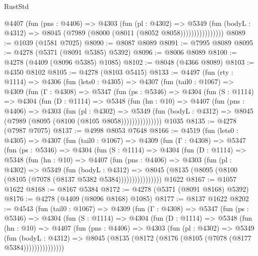 \begin{lexlean}{RustStd}
\begin{coremodule}
                    @4407
                      (fun (pns : @4406) =>
                      @4303
                        (fun (pl : @4302) =>
                        @5349
                          (fun (bodyL : @4312) =>
                          @8045 (@7989 (@8000 (@8011 (@8052 @8058))))))))))))))))
@8089 := @1039 (@1581 @7025)
@8090 := @8087 @8089
@8091 := @7995 @8089
@8095 := @4278 (@5371 (@8091 @5385) @5392)
@8096 := @8006 @8089
@8100 := @4278 (@4409 (@8096 @5385) @1085)
@8102 := @8048 (@4366 @8089)
@8103 := @4350 @8102
@8105 := @4278 (@8103 @5415)
@8133 := @4497
    (fun (rty : @1114) =>
    @4306
      (fun (lets0 : @4305) =>
      @4307
        (fun (tail0 : @1067) =>
        @4309
          (fun (Γ : @4308) =>
          @5347
            (fun (ps : @5346) =>
            @4304
              (fun (S : @1114) =>
              @4304
                (fun (D : @1114) =>
                @5348
                  (fun (hn : @10) =>
                  @4407
                    (fun (pns : @4406) =>
                    @4303
                      (fun (pl : @4302) =>
                      @5349
                        (fun (bodyL : @4312) =>
                        @8045 (@7989 (@8095 (@8100 (@8105 @8058)))))))))))))))
    @1035
@8135 := @4278 (@7987 @7075)
@8137 := @4998 @8053 @7648
@8166 := @4519
    (fun (lets0 : @4305) =>
    @4307
      (fun (tail0 : @1067) =>
      @4309
        (fun (Γ : @4308) =>
        @5347
          (fun (ps : @5346) =>
          @4304
            (fun (S : @1114) =>
            @4304
              (fun (D : @1114) =>
              @5348
                (fun (hn : @10) =>
                @4407
                  (fun (pns : @4406) =>
                  @4303
                    (fun (pl : @4302) =>
                    @5349
                      (fun (bodyL : @4312) =>
                      @8045 (@8135 (@8095 (@8100 (@8105 (@7078 (@8137 @5382 @5384))))))))))))))))
    @1622
@8167 := @1057 @1622
@8168 := @8167 @5384
@8172 := @4278 (@5371 (@8091 @8168) @5392)
@8176 := @4278 (@4409 (@8096 @8168) @1085)
@8177 := @8137 @1622
@8202 := @4543
    (fun (tail0 : @1067) =>
    @4309
      (fun (Γ : @4308) =>
      @5347
        (fun (ps : @5346) =>
        @4304
          (fun (S : @1114) =>
          @4304
            (fun (D : @1114) =>
            @5348
              (fun (hn : @10) =>
              @4407
                (fun (pns : @4406) =>
                @4303
                  (fun (pl : @4302) =>
                  @5349
                    (fun (bodyL : @4312) =>
                    @8045 (@8135 (@8172 (@8176 (@8105 (@7078 (@8177 @5384)))))))))))))))

\end{coremodule}
\end{lexlean}
